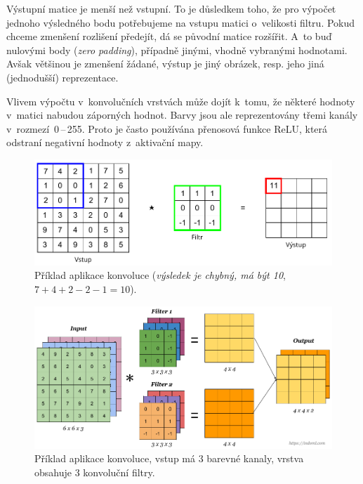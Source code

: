 \begin{compactitem}
    \item Výstupní matice je menší než vstupní. To je důsledkem toho, že pro výpočet jednoho výsledného bodu potřebujeme na vstupu matici o~velikosti filtru. Pokud chceme zmenšení rozlišení předejít, dá se původní matice rozšířit. A~to buď nulovými body (\textit{zero padding}), případně jinými, vhodně vybranými hodnotami. Avšak většinou je zmenšení žádané, výstup je jiný obrázek, resp. jeho jiná (jednodušší) reprezentace.

    \item Vlivem výpočtu v~konvolučních vrstvách může dojít k~tomu, že některé hodnoty v~matici nabudou záporných hodnot. Barvy jsou ale reprezentovány třemi kanály v~rozmezí~0\,--\,255. Proto je často používána přenosová funkce ReLU, která odstraní negativní hodnoty z~aktivační mapy.
\end{compactitem}

\begin{figure}[H]
    \centering
    \includegraphics[width=0.8\linewidth]{convolution.pdf}
    \caption{Příklad aplikace konvoluce (\textit{výsledek je chybný, má být 10}, $7+4+2-2-1=10$).}
\end{figure}

\begin{figure}[H]
    \centering
    \includegraphics[width=1\linewidth]{conv.png}
    \caption{Příklad aplikace konvoluce, vstup má 3 barevné kanaly, vrstva obsahuje 3 konvoluční filtry.}
\end{figure}

